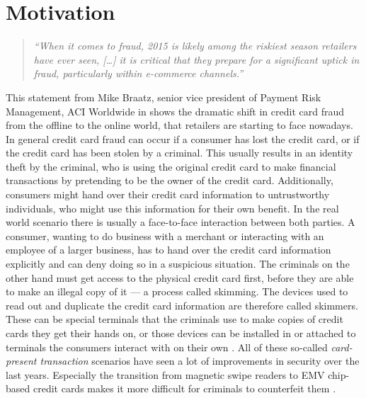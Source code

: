
\section{Motivation}
\label{sec:motivation}

\begin{quotation}
    \textit{\enquote{When it comes to fraud, 2015 is likely among the riskiest season retailers have ever seen, […]
    it is critical that they prepare for a significant uptick in fraud, particularly within e-commerce channels.} \citep{Reuters2015}}
\end{quotation}

This statement from Mike Braatz, senior vice president of Payment Risk Management, ACI Worldwide in \citep{Reuters2015} shows the dramatic shift in credit card fraud from the offline to the online world, that retailers are starting to face nowadays. \\

In general credit card fraud can occur if a consumer has lost the credit card, or if the credit card has been stolen by a criminal. This usually results in an identity theft by the criminal, who is using the original credit card to make financial transactions by pretending to be the owner of the credit card. Additionally, consumers might hand over their credit card information to untrustworthy individuals, who might use this information for their own benefit. In the real world scenario there is usually a face-to-face interaction between both parties. A consumer, wanting to do business with a merchant or interacting with an employee of a larger business, has to hand over the credit card information explicitly and can deny doing so in a suspicious situation. The criminals on the other hand must get access to the physical credit card first, before they are able to make an illegal copy of it --- a process called skimming. The devices used to read out and duplicate the credit card information are therefore called skimmers. These can be special terminals that the criminals use to make copies of credit cards they get their hands on, or those devices can be installed in or attached to terminals the consumers interact with on their own \citep{ConsumerAction2009}. All of these so-called \emph{card-present transaction} scenarios have seen a lot of improvements in security over the last years. Especially the transition from magnetic swipe readers to \gls{EMV} chip-based credit cards makes it more difficult for criminals to counterfeit them \citep{Lewis2015}. \\

